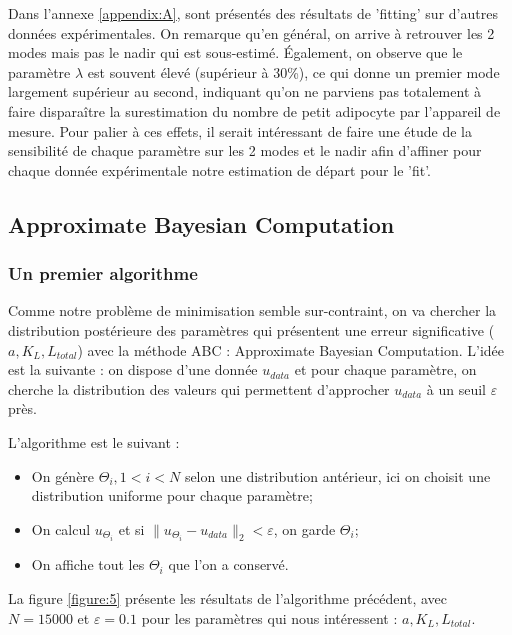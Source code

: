 \documentclass[a4paper,fleqn,leqno]{article}
\begin{document}
Dans l'annexe \ref{appendix:A}, sont présentés des résultats de 'fitting' sur d'autres données expérimentales. On remarque qu'en général, on arrive à retrouver les 2 modes mais pas le nadir qui est sous-estimé. Également, on observe que le paramètre $\lambda$ est souvent élevé (supérieur à 30\%), ce qui donne un premier mode largement supérieur au second, indiquant qu'on ne parviens pas totalement à faire disparaître la surestimation du nombre de petit adipocyte par l'appareil de mesure. Pour palier à ces effets, il serait intéressant de faire une étude de la sensibilité de chaque paramètre sur les 2 modes et le nadir afin d'affiner pour chaque donnée expérimentale notre estimation de départ pour le 'fit'.

\subsection{Approximate Bayesian Computation}

\subsubsection{Un premier algorithme}

Comme notre problème de minimisation semble sur-contraint, on va chercher la distribution postérieure des paramètres qui présentent une erreur significative ($a, K_L,L_{total}$) avec la méthode ABC : Approximate Bayesian Computation. L'idée est la suivante : on dispose d'une donnée $u_{data}$ et pour chaque paramètre, on cherche la distribution des valeurs qui permettent d'approcher $u_{data}$ à un seuil $\varepsilon$ près.

L'algorithme est le suivant :
\begin{itemize}
\item On génère $\Theta_i, 1<i<N$ selon une distribution antérieur, ici on choisit une distribution uniforme pour chaque paramètre;
\item On calcul $u_{\Theta_i}$ et si $\lVert u_{\Theta_i} - u_{data}\rVert_2 < \varepsilon$, on garde $\Theta_i$;
\item On affiche tout les $\Theta_i$ que l'on a conservé.
\end{itemize}


La figure \ref{figure:5} présente les résultats de l'algorithme précédent, avec $N=15000$ et $\varepsilon = 0.1$ pour les paramètres qui nous intéressent : $a, K_L,L_{total}$.
\end{document}
